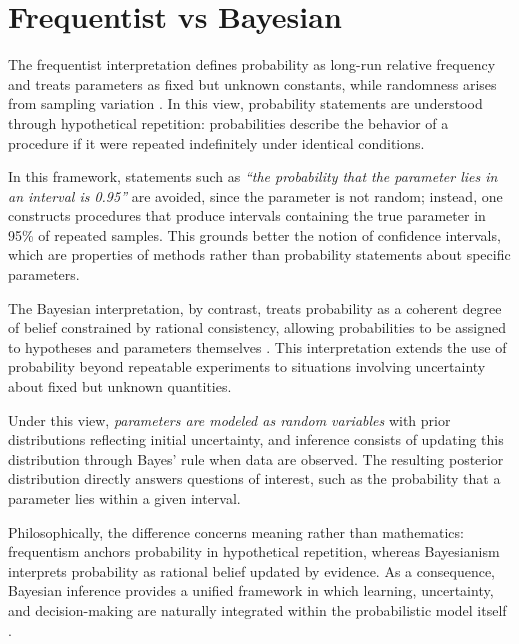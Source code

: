 \section{Frequentist vs Bayesian}

The frequentist interpretation defines probability as long-run relative frequency and treats parameters as fixed but unknown constants, while randomness arises from sampling variation \cite{degroot_2012_probability, vonmises_1928_truth}. In this view, probability statements are understood through hypothetical repetition: probabilities describe the behavior of a procedure if it were repeated indefinitely under identical conditions.

\medskip

In this framework, statements such as \textit{“the probability that the parameter lies in an interval is 0.95”} are avoided, since the parameter is not random; instead, one constructs procedures that produce intervals containing the true parameter in 95\% of repeated samples. This grounds better the notion of confidence intervals, which are properties of methods rather than probability statements about specific parameters.

\medskip

The Bayesian interpretation, by contrast, treats probability as a coherent degree of belief constrained by rational consistency, allowing probabilities to be assigned to hypotheses and parameters themselves \cite{ramsey_1931_foundations}. This interpretation extends the use of probability beyond repeatable experiments to situations involving uncertainty about fixed but unknown quantities.

\medskip

Under this view, \textit{parameters are modeled as random variables} with prior distributions reflecting initial uncertainty, and inference consists of updating this distribution through Bayes’ rule when data are observed. The resulting posterior distribution directly answers questions of interest, such as the probability that a parameter lies within a given interval.

\medskip

Philosophically, the difference concerns meaning rather than mathematics: frequentism anchors probability in hypothetical repetition, whereas Bayesianism interprets probability as rational belief updated by evidence. As a consequence, Bayesian inference provides a unified framework in which learning, uncertainty, and decision-making are naturally integrated within the probabilistic model itself \cite{definetti_1974_probability}.

